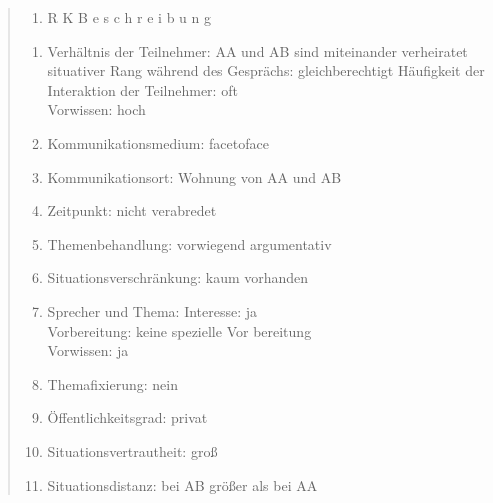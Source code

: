 \documentclass[
  letterpaper,
]{scrbook}
\providecommand{\tightlist}{%
  \setlength{\itemsep}{0pt}\setlength{\parskip}{0pt}}\usepackage{longtable,booktabs,array}
\begin{document}
\begin{quote}
\begin{enumerate}
\def\labelenumi{(\arabic{enumi})}
\setcounter{enumi}{1}
\tightlist
\item
  R K B e s c h r e i b u n g\\
\end{enumerate}

\begin{enumerate}
\def\labelenumi{\arabic{enumi}.}
\tightlist
\item
  Verhältnis der Teilnehmer: AA und AB sind miteinander verheiratet\\
  situativer Rang während des Gesprächs: gleichberechtigt Häufigkeit der
  Interaktion der Teilnehmer: oft\\
  Vorwissen: hoch\\
\item
  Kommunikationsmedium: facetoface\\
\item
  Kommunikationsort: Wohnung von AA und AB\\
\item
  Zeitpunkt: nicht verabredet\\
\item
  Themenbehandlung: vorwiegend argumentativ\\
\item
  Situationsverschränkung: kaum vorhanden\\
\item
  Sprecher und Thema: Interesse: ja\\
  Vorbereitung: keine spezielle Vor bereitung\\
  Vorwissen: ja\\
\item
  Themafixierung: nein\\
\item
  Öffentlichkeitsgrad: privat\\
\item
  Situationsvertrautheit: groß\\
\item
  Situationsdistanz: bei AB größer als bei AA\\
\end{enumerate}
\end{quote}
\end{document}
